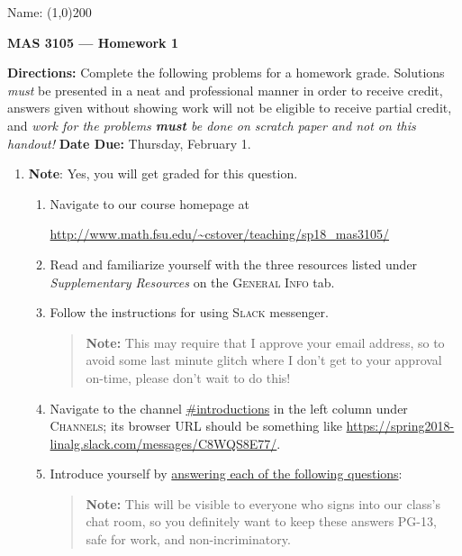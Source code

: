 \documentclass[12 pt]{article}
\newcommand{\note}[1]{\textbf{Note}: #1}
\begin{document}
\begin{flushright}Name: \line(1,0){200}\end{flushright}
\begin{center}
\Large{\textbf{MAS 3105 --- Homework 1}}
\end{center}
\textbf{Directions:} Complete the following problems for a homework grade. Solutions \textit{must} be presented in a neat and professional manner in order to receive credit, answers given without showing work will not be eligible to receive partial credit, and \textit{work for the problems \textbf{must} be done on scratch paper and not on this handout!} \textbf{Date Due:} Thursday, February 1.
\vspace{0.125in}
\begin{enumerate}[leftmargin=0in, rightmargin=-0.25in]
	\item \note{Yes, you will get graded for this question. \smiley}
	\begin{enumerate}[itemsep=0.25in]
		\item Navigate to our course homepage at
		\begin{center} \url{http://www.math.fsu.edu/~cstover/teaching/sp18_mas3105/}
		\end{center}
		\item Read and familiarize yourself with the three resources listed under \textit{Supplementary Resources} on the \textsc{General Info} tab.
		\item Follow the instructions for using \textsc{Slack} messenger.\begin{quote}\textbf{Note:} This may require that I approve your email address, so to avoid some last minute glitch where I don't get to your approval on-time, please don't wait to do this!\end{quote}
		\item Navigate to the channel \url{#introductions} in the left column under \textsc{Channels}; its browser URL should be something like \url{https://spring2018-linalg.slack.com/messages/C8WQS8E77/}.
		\item Introduce yourself by \ul{answering each of the following questions}:
		\begin{quote}\textbf{Note:} This will be visible to everyone who signs into our class's chat room, so you definitely want to keep these answers PG-13, safe for work, and non-incriminatory. {\Large\smiley}\end{quote}
		\begin{enumerate}[label=(\roman*),itemsep=3mm]

\end{enumerate}
\end{enumerate}
\end{enumerate}
\end{document}
